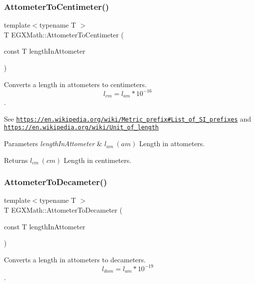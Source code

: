 \subsubsection{\texorpdfstring{Attometer\+To\+Centimeter()}{AttometerToCentimeter()}}
{\footnotesize\ttfamily template$<$typename T $>$ \\
T E\+G\+X\+Math\+::\+Attometer\+To\+Centimeter (\begin{DoxyParamCaption}\item[{const T}]{length\+In\+Attometer }\end{DoxyParamCaption})}



Converts a length in attometers to centimeters. \[ l_{cm}=l_{am} * 10^{-16} \]. 

See \href{https://en.wikipedia.org/wiki/Metric_prefix#List_of_SI_prefixes}{\tt https\+://en.\+wikipedia.\+org/wiki/\+Metric\+\_\+prefix\#\+List\+\_\+of\+\_\+\+S\+I\+\_\+prefixes} and \href{https://en.wikipedia.org/wiki/Unit_of_length}{\tt https\+://en.\+wikipedia.\+org/wiki/\+Unit\+\_\+of\+\_\+length} 
\begin{DoxyParams}{Parameters}
{\em length\+In\+Attometer} & $ l_{am}\ (am)$ Length in attometers. \\
\hline
\end{DoxyParams}
\begin{DoxyReturn}{Returns}
$ l_{cm}\ (cm)$ Length in centimeters. 
\end{DoxyReturn}
\mbox{\label{group___e_g_x_math-_conversions-_length_conversions-_attometer-_s_i_gadfda74b37224249b3fb2644fb9611d95}} 
\subsubsection{\texorpdfstring{Attometer\+To\+Decameter()}{AttometerToDecameter()}}
{\footnotesize\ttfamily template$<$typename T $>$ \\
T E\+G\+X\+Math\+::\+Attometer\+To\+Decameter (\begin{DoxyParamCaption}\item[{const T}]{length\+In\+Attometer }\end{DoxyParamCaption})}



Converts a length in attometers to decameters. \[ l_{dam}=l_{am} * 10^{-19} \]. 

